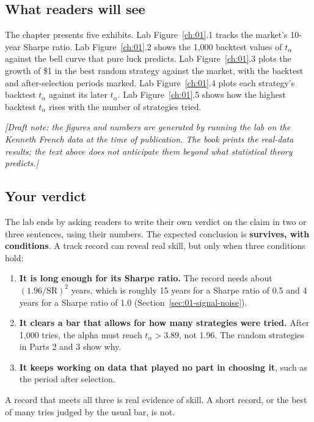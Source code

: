 \subsection*{What readers will see}

The chapter presents five exhibits. Lab Figure~\ref{ch:01}.1 tracks the market's 10-year Sharpe ratio. Lab Figure~\ref{ch:01}.2 shows the 1,000 backtest values of $t_\alpha$ against the bell curve that pure luck predicts. Lab Figure~\ref{ch:01}.3 plots the growth of \$1 in the best random strategy against the market, with the backtest and after-selection periods marked. Lab Figure~\ref{ch:01}.4 plots each strategy's backtest $t_\alpha$ against its later $t_\alpha$. Lab Figure~\ref{ch:01}.5 shows how the highest backtest $t_\alpha$ rises with the number of strategies tried.

\emph{[Draft note: the figures and numbers are generated by running the lab on the Kenneth French data at the time of publication. The book prints the real-data results; the text above does not anticipate them beyond what statistical theory predicts.]}

\subsection*{Your verdict}

The lab ends by asking readers to write their own verdict on the claim in two or three sentences, using their numbers. The expected conclusion is \textbf{survives, with conditions}. A track record can reveal real skill, but only when three conditions hold:

\begin{enumerate}
  \item \textbf{It is long enough for its Sharpe ratio.} The record needs about $(1.96/\mathrm{SR})^2$ years, which is roughly 15 years for a Sharpe ratio of 0.5 and 4 years for a Sharpe ratio of 1.0 (Section~\ref{sec:01-signal-noise}).
  \item \textbf{It clears a bar that allows for how many strategies were tried.} After 1,000 tries, the alpha must reach $t_\alpha > 3.89$, not 1.96. The random strategies in Parts 2 and 3 show why.
  \item \textbf{It keeps working on data that played no part in choosing it}, such as the period after selection.
\end{enumerate}

A record that meets all three is real evidence of skill. A short record, or the best of many tries judged by the usual bar, is not.

